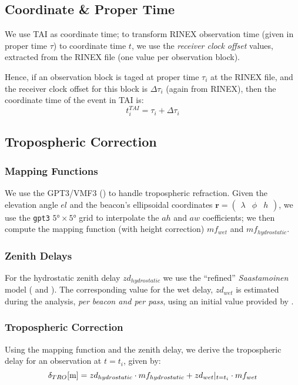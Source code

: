 \subsection{Coordinate \& Proper Time}
\label{ssec:coordinate-proper-time}
We use TAI as coordinate time; to transform RINEX observation time (given in 
proper time $\tau$) to coordinate time $t$, we use the \emph{receiver clock 
offset} values, extracted from the RINEX file (one value per observation block).

Hence, if an observation block is taged at proper time $\tau _i$ at the RINEX 
file, and the receiver clock offset for this block is $\Delta \tau _i$ (again from 
RINEX), then the coordinate time of the event in TAI is:
\begin{equation}
  t^{TAI}_i = \tau _i + \Delta \tau _i
\end{equation}

\subsection{Tropospheric Correction}
\label{ssec-tropospheric-correction}

\subsubsection{Mapping Functions}
We use the GPT3/VMF3 (\cite{Landskron2018}) to handle tropospheric refraction. 
Given the elevation angle $el$ and the beacon's ellipsoidal coordinates 
$\bm{r}=\begin{pmatrix} \lambda & \phi & h\end{pmatrix}$, we use the \texttt{gpt3} 
$\ang{5} \times \ang{5}$ grid to interpolate the $ah$ and $aw$ coefficients; 
we then compute the mapping function (with height correction) $mf_{wet}$ and 
$mf_{hydrostatic}$.

\subsubsection{Zenith Delays}
For the hydrostatic zenith delay $zd_{hydrostatic}$ we use the ``refined'' 
\emph{Saastamoinen} model (\cite{Davisetal85} and \cite{Saastamoinen72}). 
The corresponding value for the wet delay, $zd_{wet}$ is estimated during the 
analysis, \emph{per beacon and per pass}, using an initial value provided by 
\cite{Askneetal87}.

\subsubsection{Tropospheric Correction}
Using the mapping function and the zenith delay, we derive the tropospheric 
delay for an observation at $t=t_i$, given by:
\begin{equation}
  \delta _{TRO} [\si{\m}] = zd_{hydrostatic} \cdot mf_{hydrostatic} + zd_{wet}\at{t=t_i} \cdot mf_{wet}
  \label{eq:tropo-delay}
\end{equation}

